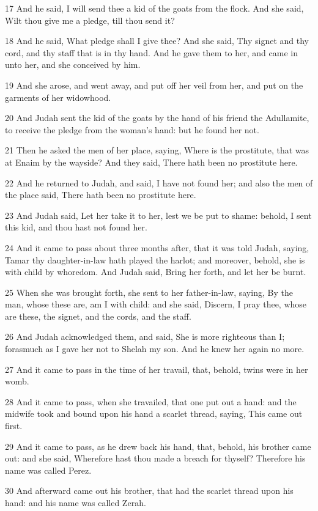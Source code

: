 \par 17 And he said, I will send thee a kid of the goats from the flock. And she said, Wilt thou give me a pledge, till thou send it?
\par 18 And he said, What pledge shall I give thee? And she said, Thy signet and thy cord, and thy staff that is in thy hand. And he gave them to her, and came in unto her, and she conceived by him.
\par 19 And she arose, and went away, and put off her veil from her, and put on the garments of her widowhood.
\par 20 And Judah sent the kid of the goats by the hand of his friend the Adullamite, to receive the pledge from the woman's hand: but he found her not.
\par 21 Then he asked the men of her place, saying, Where is the prostitute, that was at Enaim by the wayside? And they said, There hath been no prostitute here.
\par 22 And he returned to Judah, and said, I have not found her; and also the men of the place said, There hath been no prostitute here.
\par 23 And Judah said, Let her take it to her, lest we be put to shame: behold, I sent this kid, and thou hast not found her.
\par 24 And it came to pass about three months after, that it was told Judah, saying, Tamar thy daughter-in-law hath played the harlot; and moreover, behold, she is with child by whoredom. And Judah said, Bring her forth, and let her be burnt.
\par 25 When she was brought forth, she sent to her father-in-law, saying, By the man, whose these are, am I with child: and she said, Discern, I pray thee, whose are these, the signet, and the cords, and the staff.
\par 26 And Judah acknowledged them, and said, She is more righteous than I; forasmuch as I gave her not to Shelah my son. And he knew her again no more.
\par 27 And it came to pass in the time of her travail, that, behold, twins were in her womb.
\par 28 And it came to pass, when she travailed, that one put out a hand: and the midwife took and bound upon his hand a scarlet thread, saying, This came out first.
\par 29 And it came to pass, as he drew back his hand, that, behold, his brother came out: and she said, Wherefore hast thou made a breach for thyself? Therefore his name was called Perez.
\par 30 And afterward came out his brother, that had the scarlet thread upon his hand: and his name was called Zerah.

